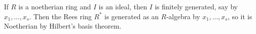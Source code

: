 If $R$ is a noetherian ring and $I$ is an ideal, then $I$ is finitely generated,
say by $x_1, \ldots, x_s$. Then the Rees ring $R^*$ is generated as an $R$-algebra
by $x_1, \ldots, x_s$, so it is Noetherian by Hilbert's basis theorem.
